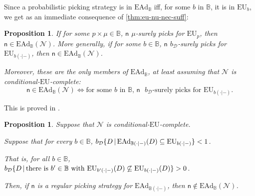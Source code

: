 \documentclass[a4paper,final]{article}
\newtheorem{proposition}[theorem]{Proposition}
\renewcommand\P{\mathbb{P}} %
\newcommand\EU{\mathrm{EU}}
\newcommand\EAd{\mathrm{EAd}}
\newcommand{\D}{\mathcal{D}}
\newcommand{\Decs}{\mathcal{D}}
\renewcommand\c{\mathsf{c}} %
\newcommand{\n}{\mathsf{n}}
\newcommand\Nu{\mathcal{N}}
\newcommand{\IB}{\mathbb{B}}
\newcommand{\IP}{\P}
\newcommand{\todoold}[2][]{\todo[backgroundcolor=white,bordercolor=orange!10,linecolor=gray!10, #1,caption={},textcolor=gray]{Pre-rev: #2}}
\newcommand{\todooldinfo}[2][]{\todoold[#1]{#2}}
\newcommand\SetDelimiter[1][]{
	\nonscript\,#1\vert \allowbreak \nonscript\,\mathopen{}}
\providecommand\given{\SetDelimiter}
\newenvironment{CCM rewritten}
{\begingroup\color{blue}} %
{\endgroup}              %
\begin{document}
Since a probabilistic picking strategy is in $\EAd_\IB$ iff, for some $b$ in $\IB$, it is in $\EU_b$, we get as an immediate consequence of \cref{thm:eu-nu-nec-suff}:
\begin{proposition}\label{thm:ead-nu-nec-suff}
If for some $p\times \mu\in \IB$, $\n$ $\mu$-surely picks for $\EU_p$, then $\n\in\EAd_\IB(\Nu)$. More generally, if for some $b\in\IB$, $\n$ $b_\Decs$-surely picks for $\EU_{b(\cdot|-)}$, then $\n\in\EAd_\IB(\Nu)$. 

Moreover, these are the only members of $\EAd_\IB$, at least assuming that $\Nu$ is conditional-$\EU$-complete: 
$$\n \in \EAd_\IB(\Nu) \Leftrightarrow \text{for some $b$ in $\IB$, $\n$ $b_\Decs$-surely picks for $\EU_{b(\cdot|-)}$.}$$

\end{proposition}
This is proved in .


	\begin{proposition}\label{thm:ead-nu-reg-nec}
		Suppose that $\Nu$ is conditional-$\EU$-complete.
		
Suppose that for every $b\in\IB$, $b_\D\{D\given \EAd_{\IB(\cdot|-)}(D)\subseteq\EU_{b(\cdot|-)}\}<1$. 

That is, for all $b\in \IB$, $b_\D\{D\given \text{there is $b'\in\IB$ with }\EU_{b'(\cdot|-)}(D)\not\subseteq\EU_{b(\cdot|-)}(D)\}>0$. 
		
		
	Then, if $\n$ is a regular picking strategy for $\EAd_{\IB(\cdot|-)}$, then $\n\notin \EAd_\IB(\Nu)$.
	\end{proposition}
	
\end{document}
